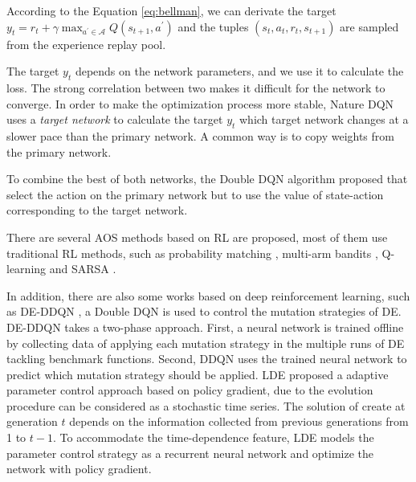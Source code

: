\documentclass[journal]{IEEEtran}
\begin{document}
According to the Equation \ref{eq:bellman}, we can derivate the target $y_{t}=r_{t}+\gamma \max _{a^{\prime} \in \mathcal{A}} Q\left(s_{t+1}, a^{\prime}\right)$ and the tuples $(s_{t}, a_{t}, r_{t}, s_{t+1})$ are sampled from the experience replay pool.


The target $y_t$ depends on the network parameters, and we use it to calculate the loss. The strong correlation between two makes it difficult for the network to converge. In order to make the optimization process more stable, Nature DQN \cite{mnih2015human} uses a \textit{target network} to calculate the target $y_t$ which target network changes at a slower pace than the primary network. A common way is to copy weights from the primary network.

To combine the best of both networks, the Double DQN \cite{ddqn} algorithm proposed that select the action on the primary network but to use the value of state-action corresponding to the target network.

There are several AOS methods based on RL are proposed, most of them use traditional RL methods, such as probability matching \cite{fialho2010toward,sharma2018performance}, multi-arm bandits \cite{dacosta2008adaptive}, Q-learning \cite{pettinger2002controlling} and SARSA \cite{sakurai2010method}.

In addition, there are also some works based on deep reinforcement learning,
such as DE-DDQN \cite{sharma2019deep}, a Double DQN is used to control the mutation strategies of DE. DE-DDQN takes a two-phase approach. First, a neural network is trained offline by collecting data of applying each mutation strategy in the multiple runs of DE tackling benchmark functions.
Second, DDQN uses the trained neural network to predict which mutation strategy should be applied.
LDE \cite{sun2021learning} proposed a adaptive parameter control approach based on policy gradient, due to the evolution procedure can be considered as a stochastic time series. The solution of create at generation $t$ depends on the information collected from previous generations from 1 to $t-1$. To accommodate the time-dependence feature, LDE models the parameter control strategy as a recurrent neural network and optimize the network with policy gradient.
\end{document}

